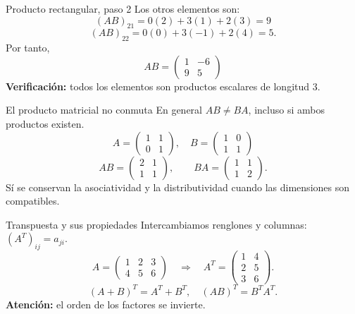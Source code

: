 \documentclass[aspectratio=169,11pt]{beamer}
\begin{document}
\begin{frame}{Producto rectangular, paso 2}
Los otros elementos son:
\[(AB)_{21}=0(2)+3(1)+2(3)=9\]
\[(AB)_{22}=0(0)+3(-1)+2(4)=5.\]
Por tanto,
\[\boxed{AB=\begin{pmatrix}1&-6\\9&5\end{pmatrix}}\]
\textbf{Verificación:} todos los elementos son productos escalares de longitud 3.
\end{frame}
\begin{frame}{El producto matricial no conmuta}
En general $AB\neq BA$, incluso si ambos productos existen.
\[A=\begin{pmatrix}1&1\\0&1\end{pmatrix},\quad B=\begin{pmatrix}1&0\\1&1\end{pmatrix}\]
\[AB=\begin{pmatrix}2&1\\1&1\end{pmatrix},\qquad BA=\begin{pmatrix}1&1\\1&2\end{pmatrix}.\]
Sí se conservan la asociatividad y la distributividad cuando las dimensiones son compatibles.
\end{frame}
\begin{frame}{Transpuesta y sus propiedades}
Intercambiamos renglones y columnas: $(A^T)_{ij}=a_{ji}$.
\[A=\begin{pmatrix}1&2&3\\4&5&6\end{pmatrix}\quad\Rightarrow\quad A^T=\begin{pmatrix}1&4\\2&5\\3&6\end{pmatrix}.\]
\[(A+B)^T=A^T+B^T,\quad (AB)^T=B^TA^T.\]
\textbf{Atención:} el orden de los factores se invierte.
\end{frame}
\end{document}
